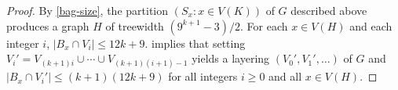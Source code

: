 \documentclass{patmorin}
\begin{document}
\begin{proof}
  By \eqref{bag-size}, the partition $(S_x:x\in V(K))$ of $G$ described above produces a graph $H$ of treewidth $(9^{k+1}-3)/2$.  For each $x\in V(H)$ and each integer $i$, $|B_x\cap V_i|\le 12k+9$.  implies that setting $V_i' = V_{(k+1)i}\cup\cdots\cup V_{(k+1)(i+1)-1}$ yields a layering $(V_0',V_1',\ldots)$ of  $G$ and $|B_x\cap V_i'|\le (k+1)(12k+9)$ for all integers $i\ge 0$ and all $x\in V(H)$.
\end{proof}



\end{document}
